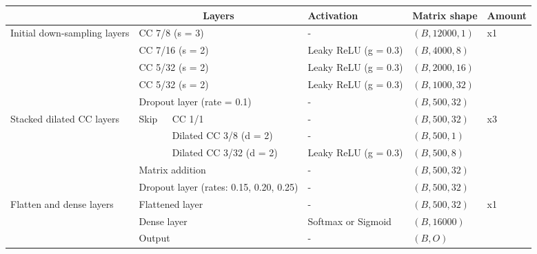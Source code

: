 \documentclass[12pt]{article}
\begin{document}
    \begin{figure}[H]
        \centering
        \begin{scriptsize}
            \begin{tabular}{l|l|l|l|l|l|l|l|l|}
                &\multicolumn{5}{c|}{Layers} & Activation & Matrix shape & Amount\\
                \hline
                \hline
                \multirow{5}{2cm}{Initial down-sampling layers} &\multicolumn{5}{|l|}{CC 7/8 (s = 3)} & - & $(B, 12000, 1)$ &\multirow{5}{*}{x1}\\
                \cline{2-8}
                &\multicolumn{5}{|l|}{CC 7/16 (s = 2)} & Leaky ReLU (g = 0.3) & $(B, 4000, 8)$ &\\
                \cline{2-8}
                &\multicolumn{5}{|l|}{CC 5/32 (s = 2)} & Leaky ReLU (g = 0.3) & $(B, 2000, 16)$ &\\
                \cline{2-8}
                &\multicolumn{5}{|l|}{CC 5/32 (s = 2)} & Leaky ReLU (g = 0.3) & $(B, 1000, 32)$ &\\
                \cline{2-8}
                &\multicolumn{5}{|l|}{Dropout layer (rate = 0.1)} & - & $(B, 500, 32)$ &\\
                \bottomrule
                \multirow{5}{2cm}{Stacked dilated CC layers} &\multirow{3}{*}{Skip} & \multicolumn{4}{l|}{CC 1/1} & - & $(B, 500, 32)$ & \multirow{5}{*}{x3}\\
                \cline{3-8}
                & & \multicolumn{4}{l|}{Dilated CC 3/8 (d = 2)} & - & $(B, 500, 1)$ &\\
                \cline{3-8}
                & &\multicolumn{4}{l|}{Dilated CC 3/32 (d = 2)} & Leaky ReLU (g = 0.3) & $(B, 500, 8)$ &\\
                \cline{2-8}
                & \multicolumn{5}{|l|}{Matrix addition} & - & $(B, 500, 32)$ &\\
                \cline{2-8}
                & \multicolumn{5}{|l|}{Dropout layer (rates: 0.15, 0.20, 0.25)} & - & $(B, 500, 32)$ &\\
                \bottomrule
                \multirow{3}{2cm}{Flatten and dense layers} & \multicolumn{5}{|l|}{Flattened layer} & - & $(B, 500, 32)$ & \multirow{3}{*}{x1}\\
                \cline{2-8}
                & \multicolumn{5}{|l|}{Dense layer}& Softmax or Sigmoid & $(B, 16000)$ &\\
                \cline{2-8}
                & \multicolumn{5}{|l|}{Output} & - & $(B, O)$ &\\

\end{tabular}
\end{scriptsize}
\end{figure}
\end{document}
